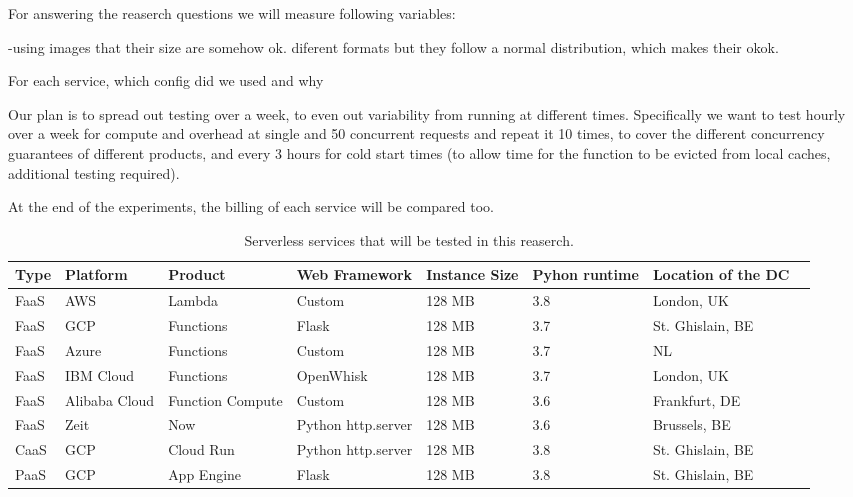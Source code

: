\documentclass[11pt]{article}
\begin{document}
For answering the reaserch questions we will measure following variables:








-using images that their size are somehow ok. diferent formats but they follow a normal distribution, which makes their okok.







For each service, which config did we used and why


Our plan is to spread out testing over a week, to even out variability from running at different times. Specifically we want to test hourly over a week for compute and overhead at single and 50 concurrent requests and repeat it 10 times, to cover the different concurrency guarantees of different products, and every 3 hours for cold start times (to allow time for the function to be evicted from local caches, additional testing required).

At the end of the experiments, the billing of each service will be compared too.







\begin{table}
\centering
 \begin{tabularx}{1\textwidth}{X X X X X X X X}
 \textbf{Type} & \textbf{Platform} & \textbf{Product} & \textbf{Web Framework} & \textbf{Instance Size} & \textbf{Pyhon runtime} & \textbf{Location of the DC} \\
 \hline
 \hline
 FaaS & AWS & Lambda & Custom & 128 MB & 3.8 & London, UK \\
 \hline
 FaaS & GCP & Functions & Flask & 128 MB & 3.7 & St. Ghislain, BE \\
 \hline
 FaaS & Azure & Functions & Custom & 128 MB & 3.7 & NL \\
 \hline
 FaaS & IBM Cloud & Functions & OpenWhisk & 128 MB & 3.7 & London, UK\\
 \hline
 FaaS & Alibaba Cloud & Function Compute & Custom & 128 MB & 3.6 & Frankfurt, DE\\
 \hline
 FaaS & Zeit & Now & Python http.server  & 128 MB & 3.6 & Brussels, BE\\
 \hline
 CaaS & GCP & Cloud Run & Python http.server & 128 MB & 3.8 & St. Ghislain, BE\\
 \hline
 PaaS & GCP & App Engine & Flask & 128 MB & 3.8 & St. Ghislain, BE\\

\end{tabularx}
\caption{Serverless services that will be tested in this reaserch.}
\label{Tab:services}

\end{table}
\end{document}
